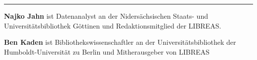 \documentclass[a4paper,
fontsize=11pt,
oneside,
numbers=noperiodatend,
parskip=half-,
bibliography=totoc,
final
]{scrartcl}
\begin{document}
\begin{center}\rule{0.5\linewidth}{\linethickness}\end{center}

\textbf{Najko Jahn} ist Datenanalyst an der Nidersächsischen Staats- und
Universitätsbibliothek Göttinen und Redaktionsmitglied der LIBREAS.

\textbf{Ben Kaden} ist Bibliothekswissenschaftler an der
Universitätsbibliothek der Humboldt-Universität zu Berlin und
Mitherausgeber von LIBREAS
\end{document}
